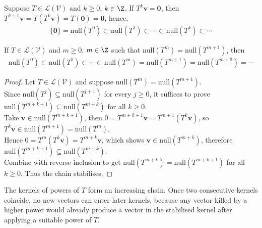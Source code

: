 Suppose $T \in \mathcal{L}(\mathcal{V})$ and $k \geq 0$, $k \in \Z$. If $T^k \mathbf{v} = \mathbf{0}$, then $T^{k+1}\mathbf{v} = T(T^k \mathbf{v}) = T(\mathbf{0}) = \mathbf{0}$, hence,
\begin{align}
\{\mathbf{0} \} = \text{null}(T^0) \subset \text{null}(T^1) \subset \cdots \subset \text{null}(T^k) \subset \cdots \nonumber
\end{align}

\begin{proposition} \label{prop:equalnullspace} If $T \in \mathcal{L}(\mathcal{V})$ and $m \geq 0$, $m \in \Z$ such that $\text{null}(T^m) = \text{null}(T^{m+1})$, then
\begin{align}
\text{null}(T^0) \subset \text{null}(T^1) \subset \cdots \subset \text{null}(T^m) = \text{null}(T^{m+1}) = \text{null}(T^{m+2}) = \cdots \nonumber
\end{align}
\begin{proof} Let $T \in \mathcal{L}(\mathcal{V})$ and suppose $\text{null}(T^m) = \text{null}(T^{m+1})$.\\
Since $\text{null}(T^j) \subseteq \text{null}(T^{j+1})$ for every $j \geq 0$, it suffices to prove $\text{null}(T^{m+k+1}) \subseteq \text{null}(T^{m+k})$ for all $k \geq 0$.\\
Take $\mathbf{v} \in \text{null}(T^{m+k+1})$, then $0 = T^{m + k +1}\mathbf{v} = T^{m+1} (T^k \mathbf{v})$, so $T^k \mathbf{v} \in \text{null}(T^{m+1}) = \text{null}(T^{m})$.\\
Hence $0 = T^m (T^k \mathbf{v}) = T^{m+k} \mathbf{v}$, which shows $\mathbf{v} \in \text{null}(T^{m+k})$, therefore $\text{null}(T^{m+k+1}) \subseteq \text{null}(T^{m+k})$.\\
Combine with reverse inclusion to get $\text{null}(T^{m+k}) = \text{null}(T^{m+k+1})$ for all $k \geq 0$. Thus the chain stabilises.
\end{proof}
\end{proposition}

The kernels of powers of $T$ form an increasing chain. Once two consecutive kernels coincide, no new vectors can enter later kernels, because any vector killed by a higher power would already produce a vector in the stabilised kernel after applying a suitable power of $T$.

